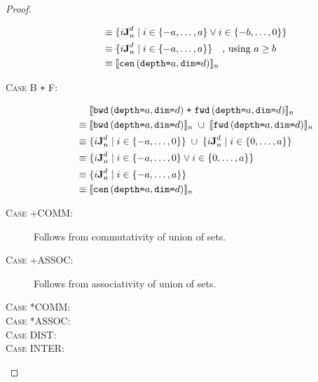 \begin{proof}
\begin{description}
\begin{align*}
      \equiv & \; \{i\singleEntry{d}{n} \mid i \in \{-a, \ldots, a\}
                    \vee i \in \{-b, \ldots, 0\} \} \\
      \equiv & \; \{i\singleEntry{d}{n} \mid i \in \{-a, \ldots, a\} \} \quad \text{, using }a \geq b \\
      \equiv & \; \interp{\stenCenS{a}{d}}_n \\
    \end{align*}
  \item[\textsc{Case B \texttt{+} F}:]
    \begin{align*}
      & \; \interp{\stenBwdS{a}{d} \; \texttt{+} \; \stenFwdS{a}{d}}_{n} \\
      \equiv & \; \interp{\stenBwdS{a}{d}}_{n} \; \cup \; \interp{\stenFwdS{a}{d}}_{n} \\
      \equiv & \; \{i\singleEntry{d}{n} \mid i \in \{-a, \ldots, 0\} \} \; \cup \;
                  \{i\singleEntry{d}{n} \mid i \in \{0, \ldots, a\} \} \\
      \equiv & \; \{i\singleEntry{d}{n} \mid i \in \{-a, \ldots, 0\}
                    \vee i \in \{0, \ldots, a\} \} \\
      \equiv & \; \{i\singleEntry{d}{n} \mid i \in \{-a, \ldots, a\} \} \\
      \equiv & \; \interp{\stenCenS{a}{d}}_n \\
    \end{align*}
  \item[\textsc{Case +COMM}:] Follows from commutativity of union of sets.
  \item[\textsc{Case +ASSOC}:] Follows from associativity of union of sets.
  \item[\textsc{Case *COMM}:]
  \item[\textsc{Case *ASSOC}:]
  \item[\textsc{Case DIST}:]
  \item[\textsc{Case INTER}:]
\end{description}
\end{proof}
